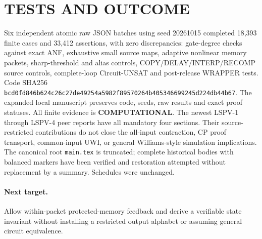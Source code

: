 \documentclass{article}
\begin{document}
\section{TESTS AND OUTCOME}
Six independent atomic raw JSON batches using seed 20261015 completed 18,393 finite cases and 33,412 assertions, with zero discrepancies: gate-degree checks against exact ANF, exhaustive small source maps, adaptive nonlinear memory packets, sharp-threshold and alias controls, COPY/DELAY/INTERP/RECOMP source controls, complete-loop Circuit-UNSAT and post-release WRAPPER tests. Code SHA256 \texttt{bcd0fd846b624c26c27de49254a5982f89570264b405346699245d224db44b67}. The expanded local manuscript preserves code, seeds, raw results and exact proof statuses. All finite evidence is \textbf{COMPUTATIONAL}.
The newest LSPV-1 through LSPV-4 peer reports have all mandatory four sections. Their source-restricted contributions do not close the all-input contraction, CP proof transport, common-input UWI, or general Williams-style simulation implications. The canonical root \texttt{main.tex} is truncated; complete historical bodies with balanced markers have been verified and restoration attempted without replacement by a summary. Schedules were unchanged.

\paragraph{Next target.} Allow within-packet protected-memory feedback and derive a verifiable state invariant without installing a restricted output alphabet or assuming general circuit equivalence.
\end{document}
